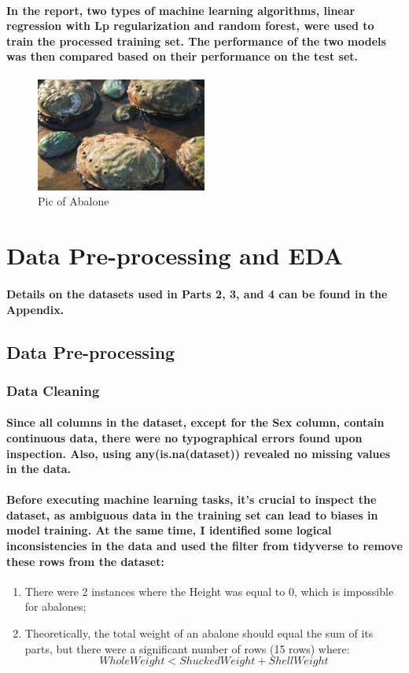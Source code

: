 \documentclass[11pt]{article} %
\begin{document}
\paragraph{In the report, two types of machine learning algorithms, linear regression with Lp regularization and random forest, were used to train the processed training set. The performance of the two models was then compared based on their performance on the test set.}
% 
% 
\begin{figure}[h]
    \centering
    \includegraphics[width=0.5\textwidth]{Pic/Abalone.jpg}
    \caption{Pic of Abalone}
\end{figure}
% 
% 
\section{Data Pre-processing and EDA}
\paragraph{\textbf{Details on the datasets used in Parts 2, 3, and 4 can be found in the Appendix.}}
\subsection{Data Pre-processing}
\subsubsection{Data Cleaning}
\paragraph{Since all columns in the dataset, except for the Sex column, contain continuous data, there were no typographical errors found upon inspection. Also, using \textbf{any(is.na(dataset))} revealed no missing values in the data.}
\paragraph{Before executing machine learning tasks, it's crucial to inspect the dataset, as ambiguous data in the training set can lead to biases in model training. At the same time, I identified some logical inconsistencies in the data and used the filter from tidyverse to remove these rows from the dataset:}
\begin{enumerate}
    \item There were 2 instances where the Height was equal to 0, which is impossible for abalones;
    \item Theoretically, the total weight of an abalone should equal the sum of its parts, but there were a significant number of rows (15 rows) where: $$WholeWeight < ShuckedWeight + ShellWeight$$
\end{enumerate}
\end{document}
